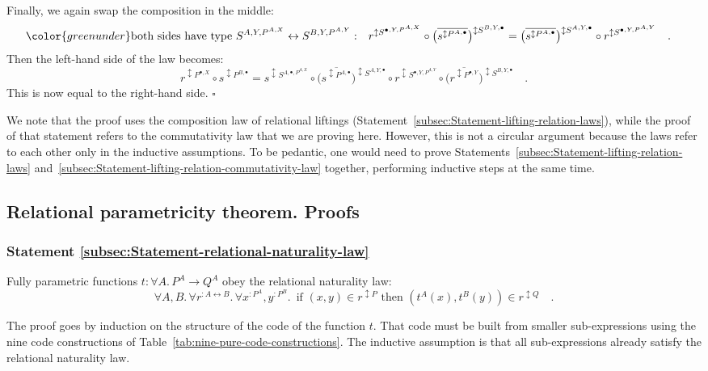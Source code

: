 Finally, we again swap the composition in the middle:
\begin{align*}
{\color{greenunder}\text{both sides have type }S^{A,Y,P^{A,X}}\leftrightarrow S^{B,Y,P^{A,Y}}:}\quad & r^{\updownarrow S^{\bullet,Y,P^{A,X}}}\circ\big(\overline{s^{\updownarrow P^{A,\bullet}}}\big)^{\updownarrow S^{B,Y,\bullet}}=\big(\overline{s^{\updownarrow P^{A,\bullet}}}\big)^{\updownarrow S^{A,Y,\bullet}}\circ r^{\updownarrow S^{\bullet,Y,P^{A,Y}}}\quad.
\end{align*}
Then the left-hand side of the law becomes:
\[
r^{\updownarrow P^{\bullet,X}}\circ s^{\updownarrow P^{B,\bullet}}=s^{\updownarrow S^{A,\bullet,P^{A,X}}}\circ\big(\overline{s^{\updownarrow P^{A,\bullet}}}\big)^{\updownarrow S^{A,Y,\bullet}}\circ r^{\updownarrow S^{\bullet,Y,P^{A,Y}}}\circ\big(\overline{r^{\updownarrow P^{\bullet,Y}}}\big)^{\updownarrow S^{B,Y,\bullet}}\quad.
\]
This is now equal to the right-hand side. $\square$

We note that the proof uses the composition law of relational liftings
(Statement~\ref{subsec:Statement-lifting-relation-laws}), while
the proof of that statement refers to the commutativity law that we
are proving here. However, this is not a circular argument because
the laws refer to each other only in the inductive assumptions. To
be pedantic, one would need to prove Statements~\ref{subsec:Statement-lifting-relation-laws}
and~\ref{subsec:Statement-lifting-relation-commutativity-law} together,
performing inductive steps at the same time.

\subsection{Relational parametricity theorem. Proofs}

\subsubsection{Statement \label{subsec:Statement-relational-naturality-law}\ref{subsec:Statement-relational-naturality-law}}

Fully parametric functions $t:\forall A.\,P^{A}\rightarrow Q^{A}$
obey the relational naturality law:
\[
\forall A,B.\,\forall r^{:A\leftrightarrow B}.\,\forall x^{:P^{A}},y^{:P^{B}}.\,\text{ if }(x,y)\in r^{\updownarrow P}\text{ then }(t^{A}(x),t^{B}(y))\in r^{\updownarrow Q}\quad.
\]

The proof goes by induction on the structure of the code of the function
$t$. That code must be built from smaller sub-expressions using the
nine code constructions of Table~\ref{tab:nine-pure-code-constructions}.
The inductive assumption is that all sub-expressions already satisfy
the relational naturality law.

